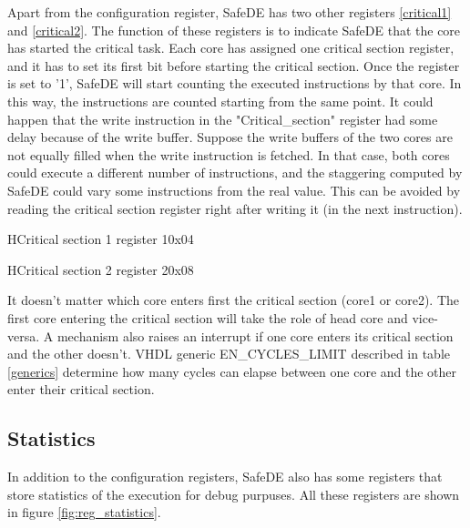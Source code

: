 Apart from the  configuration register, SafeDE has two other registers \ref{critical1} and \ref{critical2}. The function of these registers is to indicate SafeDE that the core has started the critical task. Each core has assigned one critical section register, and it has to set its first bit before starting the critical section. Once the register is set to '1', SafeDE will start counting the executed instructions by that core. In this way, the instructions are counted starting from the same point. It could happen that the write instruction in the "Critical\_section" register had some delay because of the write buffer. Suppose the write buffers of the two cores are not equally filled when the write instruction is fetched. In that case, both cores could execute a different number of instructions, and the staggering computed by SafeDE could vary some instructions from the real value. This can be avoided by reading the critical section register right after writing it (in the next instruction).

\begin{register}{H}{Critical section 1 register 1}{0x04}
	\label{critical1}
	\regnewline
\end{register}

\begin{register}{H}{Critical section 2 register 2}{0x08}
	\label{critical2}
	\regnewline
\end{register}

It doesn't matter which core enters first the critical section (core1 or core2). The first core entering the critical section will take the role of head core and vice-versa. A mechanism also raises an interrupt if one core enters its critical section and the other doesn't. VHDL generic EN\_CYCLES\_LIMIT described in table \ref{generics} determine how many cycles can elapse between one core and the other enter their critical section.





\newpage
\subsection{Statistics}

In addition to the configuration registers, SafeDE also has some registers that store statistics of the execution for debug purpuses. All these registers are shown in figure \ref{fig:reg_statistics}.

